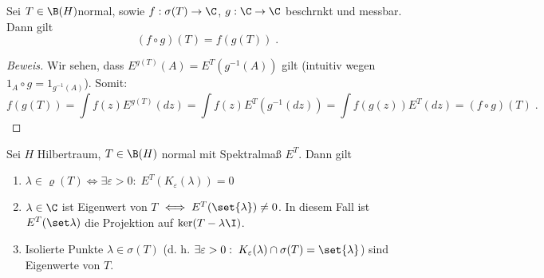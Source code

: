 		\begin{theorem}
			Sei \(T\in \B(H)\)normal, sowie \(f: \sigma(T)\to \C\), \(g:\C \to\C\) beschr\as nkt und messbar. Dann gilt \label{komposition_mess_kalk}
			\[(f\circ g)(T) = f(g(T))\;.\]
		\end{theorem}
		\begin{proof}[Beweis]
			Wir sehen, dass \(E^{g(T)}(A) = E^T(g^{-1}(A))\) gilt (intuitiv wegen \(1_A \circ g = 1_{g^{-1}(A)}\)). Somit:
			\[f(g(T)) = \int f(z) E^{g(T)}(dz) = \int f(z)E^T(g^{-1}(dz)) = \int f(g(z)) E^T(dz) = (f\circ g)(T)\;.\]
		\end{proof}
		\begin{theorem}
			Sei $H$ Hilbertraum, \(T\in \B(H)\) normal mit Spektralma\ss{} \(E^T\). Dann gilt 
			\begin{enumerate}
				\item \(\lambda \in \varrho(T) \iff \exists \varepsilon > 0:\; E^T(K_\varepsilon(\lambda)) = 0\) \label{spektralmass_spektrum_1}
				\item \(\lambda \in \C\) ist Eigenwert von $T$ \(\iff E^T(\set{\lambda}) \neq 0\). In diesem Fall ist \(E^T(\set\lambda)\) die Projektion auf \(\ker(T-\lambda\I)\). \label{spektralmass_spektrum_2}
				\item Isolierte Punkte \(\lambda \in \sigma(T)\) (d. h. \(\exists \varepsilon > 0:\; K_\varepsilon(\lambda)\cap \sigma(T) = \set{\lambda}\)) sind Eigenwerte von $T$. \label{spektralmass_spektrum_3}
			\end{enumerate}
		\end{theorem}
